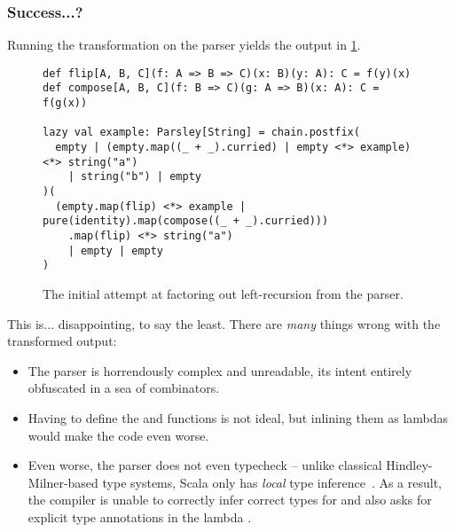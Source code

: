 \documentclass[../../main.tex]{subfiles}
\begin{document}
\subsubsection{Success...?}
Running the transformation on the  parser yields the output in \cref{fig:leftrec-example-bad}.
%
\begin{figure}[htbp]
\begin{verbatim}
def flip[A, B, C](f: A => B => C)(x: B)(y: A): C = f(y)(x)
def compose[A, B, C](f: B => C)(g: A => B)(x: A): C = f(g(x))

lazy val example: Parsley[String] = chain.postfix(
  empty | (empty.map((_ + _).curried) | empty <*> example) <*> string("a")
    | string("b") | empty
)(
  (empty.map(flip) <*> example | pure(identity).map(compose((_ + _).curried)))
    .map(flip) <*> string("a")
    | empty | empty
)
\end{verbatim}
\caption{The initial attempt at factoring out left-recursion from the  parser.}
\label{fig:leftrec-example-bad}
\end{figure}
%
This is... disappointing, to say the least.
There are \emph{many} things wrong with the transformed output:
\begin{itemize}
  \item The parser is horrendously complex and unreadable, its intent entirely obfuscated in a sea of combinators.
  \item Having to define the  and  functions is not ideal, but inlining them as lambdas would make the code even worse.
  \item Even worse, the parser does not even typecheck -- unlike classical Hindley-Milner-based type systems, Scala only has \emph{local} type inference~\cite{cremet_core_2006}. As a result, the compiler is unable to correctly infer correct types for  and also asks for explicit type annotations in the lambda .
\end{itemize}
\end{document}
